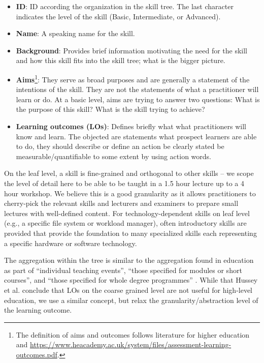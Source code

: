 \documentclass[jocse]{jocseart}
\begin{document}
\begin{itemize}
  \item \textbf{ID}: ID according the organization in the skill tree. The last character indicates the level of the skill (Basic, Intermediate, or Advanced).
  \item \textbf{Name}: A speaking name for the skill.
  \item \textbf{Background}: Provides brief information motivating the need for the skill and how this skill fits into the skill tree; what is the bigger picture.
  \item \textbf{Aims}\footnote{The definition of aims and outcomes follows literature for higher education \cite{williamson2011good} and \url{https://www.heacademy.ac.uk/system/files/assessment-learning-outcomes.pdf}.}: They serve as broad purposes and are generally a statement of the intentions of the skill.
  They are not the statements of what a practitioner will learn or do.
  At a basic level, aims are trying to answer two questions: What is the purpose of this skill?
  What is the skill trying to achieve?
  \item \textbf{Learning outcomes (LOs)}: Defines briefly what what practitioners will know and learn.
  The objected are statements what prospect learners are able to do, they should
  describe or define an action be clearly stated be measurable/quantifiable to some extent by using action words.
\end{itemize}

On the leaf level, a skill is fine-grained and orthogonal to other skills -- we scope the level of detail here to be able to be taught in a 1.5 hour lecture up to a 4 hour workshop.
We believe this is a good granularity as it allows practitioners to cherry-pick the relevant skills and lecturers and examiners to prepare small lectures with well-defined content.
For technology-dependent skills on leaf level (e.g., a specific file system or workload manager), often introductory skills are provided that provide the foundation to many specialized skills each representing a specific hardware or software technology.

The aggregation within the tree is similar to the aggregation found in education as part of “individual teaching events”, “those specified for modules or short courses”, and “those specified for whole degree programmes” \cite{hussey2008learning}.
While that Hussey et al. conclude that LOs on the coarse grained level are not useful for high-level education, we use a similar concept, but relax the granularity/abstraction level of the learning outcome.
\end{document}
